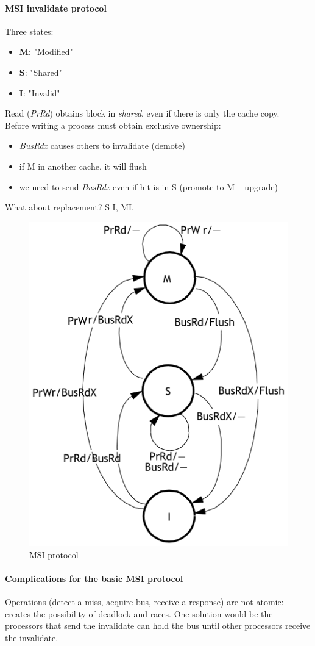 \paragraph{MSI invalidate protocol}
Three states:
\begin{itemize}
    \item \textbf{M}: "Modified"
    \item \textbf{S}: "Shared"
    \item \textbf{I}: "Invalid"
\end{itemize}
Read (\textit{PrRd}) obtains block in \textit{shared}, even if there is only the cache copy.\\
Before writing a process must obtain exclusive ownership:
\begin{itemize}
    \item \textit{BusRdx} causes others to invalidate (demote)
    \item if M in another cache, it will flush
    \item we need to send \textit{BusRdx} even if hit is in S (promote to M -- upgrade)
\end{itemize}
What about replacement?
S \textrightarrow I, M\textrightarrow I\@.
\begin{figure}[h]
    \centering
    \includegraphics[width=0.7\linewidth]{images/msi-protocol}
    \caption{MSI protocol}
    \label{fig:msi-protocol}
\end{figure}

\paragraph{Complications for the basic MSI protocol}
Operations (detect a miss, acquire bus, receive a response) are not atomic: creates the possibility of deadlock and
races.
One solution would be the processors that send the invalidate can hold the bus until other processors receive the
invalidate.

